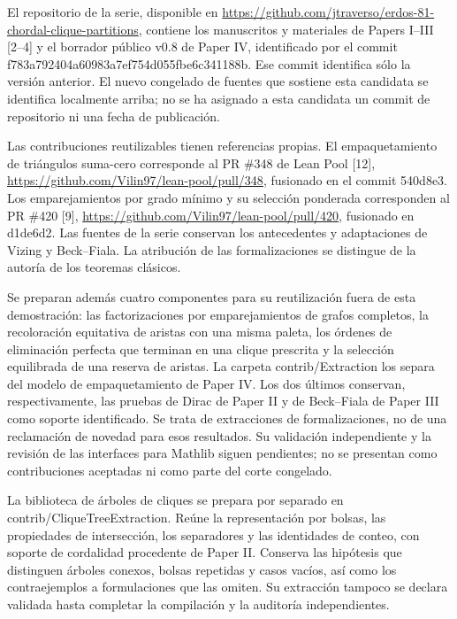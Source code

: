 \documentclass[spanish,11pt,a4paper]{article}
\begin{document}
El repositorio de la serie, disponible en \url{https://github.com/jtraverso/erdos-81-chordal-clique-partitions}, contiene los manuscritos y materiales de Papers I--III {[}2--4{]} y el borrador público v0.8 de Paper IV, identificado por el commit {\ttfamily\small f783a792404a\discretionary{\hbox{\ensuremath{\hookrightarrow}}}{}{}60983a7ef754\discretionary{\hbox{\ensuremath{\hookrightarrow}}}{}{}d055fbe6c341\discretionary{\hbox{\ensuremath{\hookrightarrow}}}{}{}188b}. Ese commit identifica sólo la versión anterior. El nuevo congelado de fuentes que sostiene esta candidata se identifica localmente arriba; no se ha asignado a esta candidata un commit de repositorio ni una fecha de publicación.

Las contribuciones reutilizables tienen referencias propias. El empaquetamiento de triángulos suma-cero corresponde al PR \#348 de Lean Pool {[}12{]}, \url{https://github.com/Vilin97/lean-pool/pull/348}, fusionado en el commit {\ttfamily\small 540d8e3}. Los emparejamientos por grado mínimo y su selección ponderada corresponden al PR \#420 {[}9{]}, \url{https://github.com/Vilin97/lean-pool/pull/420}, fusionado en {\ttfamily\small d1de6d2}. Las fuentes de la serie conservan los antecedentes y adaptaciones de Vizing y Beck--Fiala. La atribución de las formalizaciones se distingue de la autoría de los teoremas clásicos.

Se preparan además cuatro componentes para su reutilización fuera de esta demostración: las factorizaciones por emparejamientos de grafos completos, la recoloración equitativa de aristas con una misma paleta, los órdenes de eliminación perfecta que terminan en una clique prescrita y la selección equilibrada de una reserva de aristas. La carpeta {\ttfamily\small contrib/\discretionary{\hbox{\ensuremath{\hookrightarrow}}}{}{}Extraction} los separa del modelo de empaquetamiento de Paper IV. Los dos últimos conservan, respectivamente, las pruebas de Dirac de Paper II y de Beck--Fiala de Paper III como soporte identificado. Se trata de extracciones de formalizaciones, no de una reclamación de novedad para esos resultados. Su validación independiente y la revisión de las interfaces para Mathlib siguen pendientes; no se presentan como contribuciones aceptadas ni como parte del corte congelado.

La biblioteca de árboles de cliques se prepara por separado en {\ttfamily\small contrib/\discretionary{\hbox{\ensuremath{\hookrightarrow}}}{}{}CliqueTreeEx\discretionary{\hbox{\ensuremath{\hookrightarrow}}}{}{}traction}. Reúne la representación por bolsas, las propiedades de intersección, los separadores y las identidades de conteo, con soporte de cordalidad procedente de Paper II. Conserva las hipótesis que distinguen árboles conexos, bolsas repetidas y casos vacíos, así como los contraejemplos a formulaciones que las omiten. Su extracción tampoco se declara validada hasta completar la compilación y la auditoría independientes.
\end{document}
